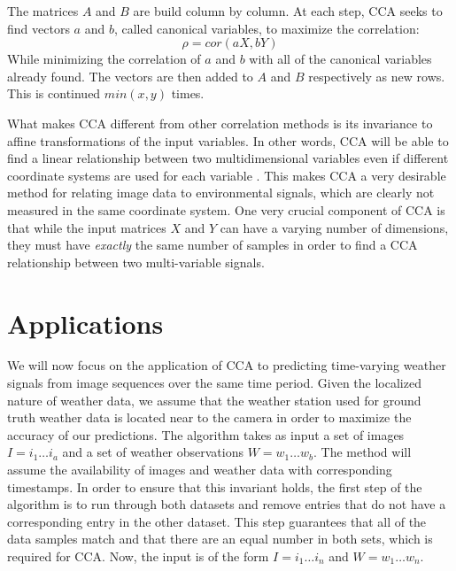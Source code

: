 The matrices $A$ and $B$ are build column by column. At each step, CCA seeks to find vectors $a$ and $b$, called canonical variables, to maximize the correlation:
\begin{equation}\label{eq:maxcorrcca}\rho = cor(aX,bY)\end{equation}
While minimizing the correlation of $a$ and $b$ with all of the canonical variables already found. The vectors are then added to $A$ and $B$ respectively as new rows. This is continued $min(x,y)$ times.

What makes CCA different from other correlation methods is its invariance to affine transformations of the input variables. In other words, CCA will be able to find a linear relationship between two multidimensional variables even if different coordinate systems are used for each variable \cite{bkl97}. This makes CCA a very desirable method for relating image data to environmental signals, which are clearly not measured in the same coordinate system. One very crucial component of CCA is that while the input matrices $X$ and $Y$ can have a varying number of dimensions, they must have \textit{exactly} the same number of samples in order to find a CCA relationship between two multi-variable signals.

\section{Applications}
We will now focus on the application of CCA to predicting time-varying weather signals from image sequences over the same time period. Given the localized nature of weather data, we assume that the weather station used for ground truth weather data is located near to the camera in order to maximize the accuracy of our predictions. The algorithm takes as input a set of images $I=i_1\ldots i_a$ and a set of weather observations $W=w_1\ldots w_b$. The method will assume the availability of images and weather data with corresponding timestamps. In order to ensure that this invariant holds, the first step of the algorithm is to run through both datasets and remove entries that do not have a corresponding entry in the other dataset. This step guarantees that all of the data samples match and that there are an equal number in both sets, which is required for CCA. Now, the input is of the form $I=i_1\ldots i_n$ and $W=w_1\ldots w_n$.

